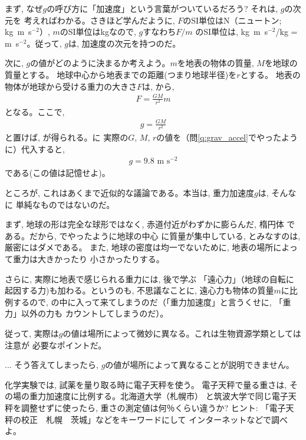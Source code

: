 まず, なぜ$g$の呼び方に「加速度」という言葉がついているだろう? それは, $g$の次元を
考えればわかる。さきほど学んだように, 
$F$のSI単位はN（ニュートン; kg~m~s$^{-2}$）, $m$のSI単位はkgなので, $g$すなわち$F/m$
のSI単位は, kg~m~s$^{-2}$/kg = m~s$^{-2}$。従って, $g$は, 
加速度の次元を持つのだ。

次に, $g$の値がどのように決まるか考えよう。$m$を地表の物体の質量, $M$を地球の質量とする。
地球中心から地表までの距離(つまり地球半径)を$r$とする。
地表の物体が地球から受ける重力の大きさ$F$は, 
から, 
\begin{eqnarray}
F=\frac{GM}{r^2}m\label{eq:gravity000}
\end{eqnarray}
となる。ここで, 
\begin{eqnarray}
g=\frac{GM}{r^2}\label{eq:gravity_acc_GM_r2}
\end{eqnarray}
と置けば, が得られる。に
実際の$G$, $M$, $r$の値を（問\ref{q:grav_accel}でやったように）代入すると, 
\begin{eqnarray}
g= 9.8\,\,\text{m~s$^{-2}$}\label{eq:gravity_earth2}
\end{eqnarray}
である(この値は記憶せよ)。

ところが, これはあくまで近似的な議論である。本当は, 重力加速度$g$は, そんなに
単純なものではないのだ。

まず, 地球の形は完全な球形ではなく, 赤道付近がわずかに膨らんだ, 楕円体
である。だから, でやったように地球の中心
に質量が集中している, とみなすのは, 厳密にはダメである。
また, 地球の密度は均一でないために, 地表の場所によって重力は大きかったり
小さかったりする。

さらに, 実際に地表で感じられる重力には, 後で学ぶ
「遠心力」（地球の自転に起因する力)も加わる。というのも, 不思議なことに, 
遠心力も物体の質量$m$に比例するので, 
の中に入って来てしまうのだ（「重力加速度」と言うくせに, 「重力」以外の力も
カウントしてしまうのだ）。

従って, 実際は$g$の値は場所によって微妙に異なる。これは生物資源学類としては注意が
必要なポイントだ。

\begin{freqmiss}{\small{} ... そう答えてしまったら, 
$g$の値が場所によって異なることが説明できません。}\end{freqmiss}\mv

\begin{q}\label{q:weight_calib} 化学実験では, 
試薬を量り取る時に電子天秤を使う。
電子天秤で量る重さは, その場の重力加速度に比例する。北海道大学（札幌市）
と筑波大学で同じ電子天秤を調整せずに使ったら, 重さの測定値は何％くらい違うか?
ヒント: 「電子天秤の校正　札幌　茨城」などをキーワードにして
インターネットなどで調べよ。\end{q}

